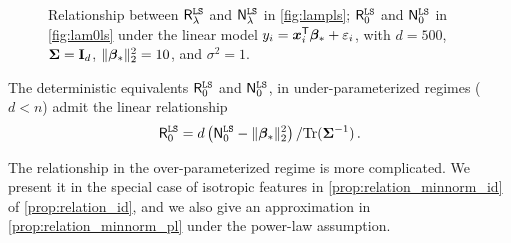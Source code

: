 \begin{figure}[t]
    \centering
    \caption{Relationship between $\mathsf R^{\tt LS}_\lambda$ and $\mathsf N^{\tt LS}_\lambda$ in \cref{fig:lampls}; $\mathsf R^{\tt LS}_0$ and $\mathsf N^{\tt LS}_0$ in \cref{fig:lam0ls} under the linear model \(y_i = {\boldsymbol x}_i^{\mathsf T} {\boldsymbol \beta}_* + \varepsilon_i\), with $d=500$, \({\boldsymbol \Sigma} = {\mathbf I}_d\), \(\|{\boldsymbol \beta}_*\|_2^2=10\), and \(\sigma^2 = 1\).} %
    \label{fig:linear_risk}\vspace{-0.2cm}
\end{figure}


\begin{proposition}\label{prop:relation_minnorm_underparam}
The deterministic equivalents $\mathsf R^{\tt LS}_{0}$ and $\mathsf N^{\tt LS}_{0}$, in under-parameterized regimes ($d < n$) admit the linear relationship
\[
    \begin{aligned}
        \mathsf R^{\tt LS}_0 = {d}\left(\mathsf N^{\tt LS}_0 - \|{\boldsymbol \beta}_*\|_2^2\right)/{{\rm Tr}({\boldsymbol \Sigma}^{-1})}\,.
    \end{aligned}
\]
\end{proposition}

The relationship in the over-parameterized regime is more complicated. We present it in the special case of isotropic features in \cref{prop:relation_minnorm_id} of \cref{prop:relation_id}, and we also give an approximation in \cref{prop:relation_minnorm_pl} under the power-law assumption.


